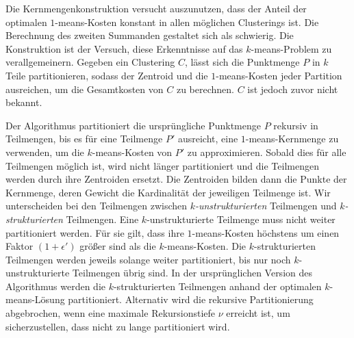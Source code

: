 Die Kernmengenkonstruktion versucht auszunutzen, dass der Anteil der optimalen $1$-means-Kosten konstant in allen möglichen
Clusterings ist. Die Berechnung des zweiten Summanden gestaltet sich als schwierig. Die Konstruktion ist der Versuch, diese
Erkenntnisse auf das $k$-means-Problem zu verallgemeinern. Gegeben ein Clustering $C$, lässt sich die Punktmenge $P$ in
$k$ Teile partitionieren, sodass der Zentroid und die $1$-means-Kosten jeder Partition ausreichen, um die Gesamtkosten von $C$
zu berechnen. $C$ ist jedoch zuvor nicht bekannt.

Der Algorithmus partitioniert die ursprüngliche Punktmenge $P$ rekursiv in Teilmengen, bis es für eine Teilmenge $P'$ ausreicht,
eine $1$-means-Kernmenge zu verwenden, um die $k$-means-Kosten von $P'$ zu approximieren. Sobald dies für alle Teilmengen
möglich ist, wird nicht länger partitioniert und die Teilmengen werden durch ihre Zentroiden ersetzt. Die Zentroiden bilden
dann die Punkte der Kernmenge, deren Gewicht die Kardinalität der jeweiligen Teilmenge ist. Wir unterscheiden bei den
Teilmengen zwischen \emph{$k$-unstrukturierten} Teilmengen und \emph{$k$-strukturierten} Teilmengen. Eine $k$-unstrukturierte
Teilmenge muss nicht weiter partitioniert werden. Für sie gilt, dass ihre $1$-means-Kosten höchstens um einen Faktor
$(1+\epsilon')$ größer sind als die $k$-means-Kosten. Die $k$-strukturierten Teilmengen werden jeweils solange weiter
partitioniert, bis nur noch $k$-unstrukturierte Teilmengen übrig sind. In der ursprünglichen Version des Algorithmus werden
die $k$-strukturierten Teilmengen anhand der optimalen $k$-means-Lösung partitioniert. Alternativ wird die rekursive
Partitionierung abgebrochen, wenn eine maximale Rekursionstiefe $\nu$ erreicht ist, um sicherzustellen, dass nicht zu lange
partitioniert wird.

